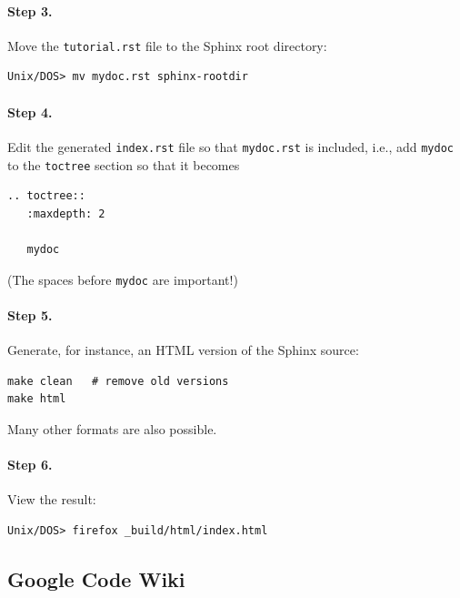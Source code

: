 \documentclass{article}
\begin{document}
\paragraph{Step 3.}
Move the {\fontsize{10pt}{10pt}\verb!tutorial.rst!} file to the Sphinx root directory:
\begin{Verbatim}[fontsize=\fontsize{9pt}{9pt},tabsize=8,baselinestretch=0.85,
fontfamily=tt,xleftmargin=7mm]
Unix/DOS> mv mydoc.rst sphinx-rootdir
\end{Verbatim}
\noindent

\paragraph{Step 4.}
Edit the generated {\fontsize{10pt}{10pt}\verb!index.rst!} file so that {\fontsize{10pt}{10pt}\verb!mydoc.rst!}
is included, i.e., add {\fontsize{10pt}{10pt}\verb!mydoc!} to the {\fontsize{10pt}{10pt}\verb!toctree!} section so that it becomes
\begin{Verbatim}[fontsize=\fontsize{9pt}{9pt},tabsize=8,baselinestretch=0.85,
fontfamily=tt,xleftmargin=7mm]
.. toctree::
   :maxdepth: 2

   mydoc
\end{Verbatim}
\noindent
(The spaces before {\fontsize{10pt}{10pt}\verb!mydoc!} are important!)

\paragraph{Step 5.}
Generate, for instance, an HTML version of the Sphinx source:
\begin{Verbatim}[fontsize=\fontsize{9pt}{9pt},tabsize=8,baselinestretch=0.85,
fontfamily=tt,xleftmargin=7mm]
make clean   # remove old versions
make html
\end{Verbatim}
\noindent
Many other formats are also possible.

\paragraph{Step 6.}
View the result:
\begin{Verbatim}[fontsize=\fontsize{9pt}{9pt},tabsize=8,baselinestretch=0.85,
fontfamily=tt,xleftmargin=7mm]
Unix/DOS> firefox _build/html/index.html
\end{Verbatim}
\noindent

\subsection{Google Code Wiki}
\end{document}
